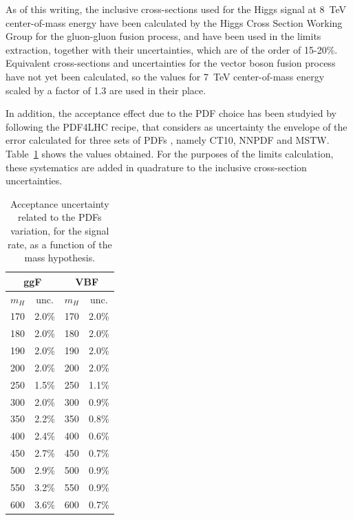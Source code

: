 As of this writing, the inclusive cross-sections used for the Higgs
signal at 8~TeV center-of-mass energy have been calculated by the
Higgs Cross Section Working Group
\cite{LHCHiggsCrossSectionWorkingGroup:2011ti} for the
gluon-gluon fusion process, and have been used in the limits
extraction, together with their uncertainties, which are of the
order of 15-20\%. Equivalent cross-sections and uncertainties for the
vector boson fusion process have not yet been calculated, so the values
for 7~TeV center-of-mass energy scaled by a factor of 1.3 are used in
their place.

In addition, the acceptance effect due to the PDF choice has been
studyied by following the PDF4LHC recipe, that considers as
uncertainty the envelope of the error calculated for three sets of
PDFs \cite{Whalley:2005nh}, namely CT10, NNPDF and MSTW.
Table~\ref{tab:signalPDF} shows the values obtained.  For the purposes
of the limits calculation, these systematics are added in quadrature
to the inclusive cross-section uncertainties.
%
\begin{table}[h!t]
  \caption{Acceptance uncertainty related to the PDFs variation, 
           for the signal rate, as a function of the mass hypothesis.}
  \label{tab:signalPDF}
  \begin{center}
    \begin{tabular}{lc|lc}
      \hline
      \multicolumn{2}{c|}{ggF} & \multicolumn{2}{c}{VBF} \\
      \hline
      $m_{H}$ &  unc.   & $m_{H}$ &  unc.  \\
      \hline
       170  &  2.0\%  &  170  &  2.0\% \\ %
       180  &  2.0\%  &  180  &  2.0\% \\ %
       190  &  2.0\%  &  190  &  2.0\% \\ %
       200  &  2.0\%  &  200  &  2.0\% \\ %
       250  &  1.5\%  &  250  &  1.1\% \\  
       300  &  2.0\%  &  300  &  0.9\% \\  
       350  &  2.2\%  &  350  &  0.8\% \\  
       400  &  2.4\%  &  400  &  0.6\% \\  
       450  &  2.7\%  &  450  &  0.7\% \\  
       500  &  2.9\%  &  500  &  0.9\% \\  
       550  &  3.2\%  &  550  &  0.9\% \\  
       600  &  3.6\%  &  600  &  0.7\% \\  
      \hline
    \end{tabular}
  \end{center}
\end{table}

